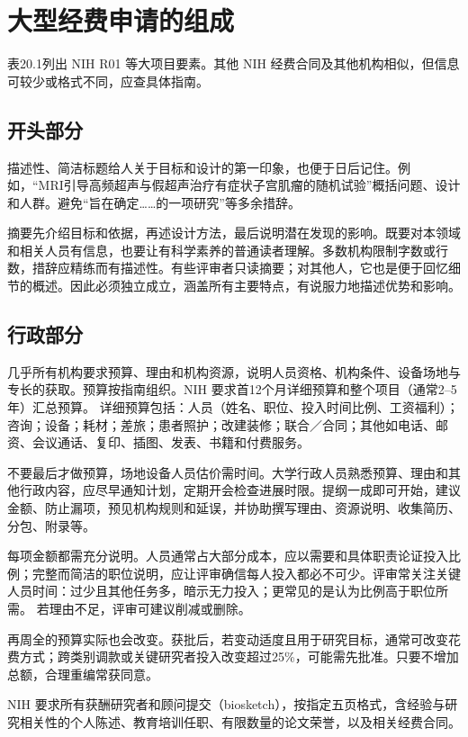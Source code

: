 \section{大型经费申请的组成}
表20.1列出 NIH R01 等大项目要素。其他 NIH 经费合同及其他机构相似，但信息可较少或格式不同，应查具体指南。
\subsection{开头部分}
描述性、简洁标题给人关于目标和设计的第一印象，也便于日后记住。例如，“MRI引导高频超声与假超声治疗有症状子宫肌瘤的随机试验”概括问题、设计和人群。避免“旨在确定……的一项研究”等多余措辞。

摘要先介绍目标和依据，再述设计方法，最后说明潜在发现的影响。既要对本领域和相关人员有信息，也要让有科学素养的普通读者理解。多数机构限制字数或行数，措辞应精练而有描述性。有些评审者只读摘要；对其他人，它也是便于回忆细节的概述。因此必须独立成立，涵盖所有主要特点，有说服力地描述优势和影响。

\subsection{行政部分}
几乎所有机构要求预算、理由和机构资源，说明人员资格、机构条件、设备场地与专长的获取。预算按指南组织。NIH 要求首12个月详细预算和整个项目（通常2--5年）汇总预算。
详细预算包括：人员（姓名、职位、投入时间比例、工资福利）；咨询；设备；耗材；差旅；患者照护；改建装修；联合／合同；其他如电话、邮资、会议通话、复印、插图、发表、书籍和付费服务。

不要最后才做预算，场地设备人员估价需时间。大学行政人员熟悉预算、理由和其他行政内容，应尽早通知计划，定期开会检查进展时限。提纲一成即可开始，建议金额、防止漏项，预见机构规则和延误，并协助撰写理由、资源说明、收集简历、分包、附录等。

每项金额都需充分说明。人员通常占大部分成本，应以需要和具体职责论证投入比例；完整而简洁的职位说明，应让评审确信每人投入都必不可少。评审常关注关键人员时间：过少且其他任务多，暗示无力投入；更常见的是认为比例高于职位所需。
若理由不足，评审可建议削减或删除。

再周全的预算实际也会改变。获批后，若变动适度且用于研究目标，通常可改变花费方式；跨类别调款或关键研究者投入改变超过25\%，可能需先批准。只要不增加总额，合理重编常获同意。

NIH 要求所有获酬研究者和顾问提交（biosketch），按指定五页格式，含经验与研究相关性的个人陈述、教育培训任职、有限数量的论文荣誉，以及相关经费合同。

